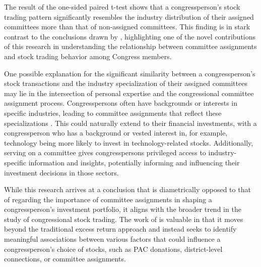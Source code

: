 \documentclass[15pt,letterpaper]{article}
\begin{document}

The result of the one-sided paired t-test shows that a congressperson's stock trading pattern significantly resembles the industry distribution of their assigned committees more than that of non-assigned committees. This finding is in stark contrast to the conclusions drawn by \cite{eg14}, highlighting one of the novel contributions of this research in understanding the relationship between committee assignments and stock trading behavior among Congress members.

One possible explanation for the significant similarity between a congressperson's stock transactions and the industry specialization of their assigned committees may lie in the intersection of personal expertise and the congressional committee assignment process. Congresspersons often have backgrounds or interests in specific industries, leading to committee assignments that reflect these specializations \citep{10.2307/40709444, 10.2307/2111156, kiewiet1991logic, krehbiel1992information, curry2018knowledge}. This could naturally extend to their financial investments, with a congressperson who has a background or vested interest in, for example, technology being more likely to invest in technology-related stocks. Additionally, serving on a committee gives congresspersons privileged access to industry-specific information and insights, potentially informing and influencing their investment decisions in those sectors.


While this research arrives at a conclusion that is diametrically opposed to that of \cite{eg14} regarding the importance of committee assignments in shaping a congressperson's investment portfolio, it aligns with the broader trend in the study of congressional stock trading. The work of \cite{eg14} is valuable in that it moves beyond the traditional excess return approach and instead seeks to identify meaningful associations between various factors that could influence a congressperson's choice of stocks, such as PAC donations, district-level connections, or committee assignments.
\end{document}
